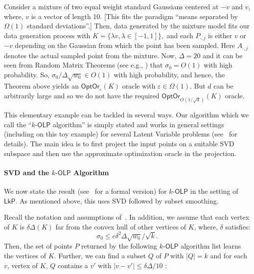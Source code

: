\documentclass[11pt,letterpaper]{article}
\newcommand{\lkp}{{\mathsf {LkP}}\xspace}
\newcommand{\olp}{{\mathsf {OLP}}\xspace}
\newcommand{\kolp}{k\mbox{-}\olp}
\newcommand{\Pdot}[1]{{P_{\cdot, #1}}}
\newcommand{\Adot}[1]{{A_{\cdot, #1}}}
\newcommand{\opto}{{\mathsf{OptOr}}}
\begin{document}
Consider a mixture of two equal weight standard Gaussians centered at $-v$ and $v$, where, $v$ is a vector of length 10. [This fits the paradigm ``means separated by $\Omega(1)$ standard deviations''.] Then, data generated by the mixture model fits our data generation process with $K=\{ \lambda v, \lambda\in [-1,1]\},$ and each $\Pdot{j}$ is either $v$ or $-v$ depending on the Gaussian from which the point has been sampled. Here $\Adot{j}$ denotes the actual sampled point from the mixture. 
Now, $\Delta =20$ and it can be seen from Random Matrix Theorems (see e.g., \cite{vers}) that $\sigma_0=O(1)$ with high probability. 
So, $\sigma_0/\Delta\sqrt{w_0}\in O(1)$ with high probability, and hence, the Theorem above 
yields an $\opto_\varepsilon(K)$ oracle with $\varepsilon\in\Omega(1)$. But
$d$ can be arbitrarily large and so we do not have the required $\opto_{O(1/\sqrt d)}(K)$  oracle. 

This elementary example can be tackled in several ways. Our algorithm which we call the ``$\kolp$ algorithm'' is simply stated and works in general settings (including on this toy example) for several Latent Variable problems (see~ for details). The main idea is to first project the input points on a suitable SVD subspace and then use the approximate optimization oracle in the projection.

\paragraph{SVD and the $\kolp$ Algorithm}

We now state the result (see~ for a formal version) for $\kolp$ in the setting of $\lkp$. As mentioned above, this uses SVD followed by subset smoothing. 

\begin{theorem}\label{kolp-thm}
Recall the notation and assumptions of~. In addition, we assume that each vertex of $K$ is $\delta\Delta(K)$ far from the convex hull of other vertices of $K$, where, $\delta$ satisfies:
$$\sigma_0\leq c\delta^2\Delta\sqrt {w_0}/\sqrt k.$$
Then, the set of points $P$ returned by the following $\kolp$ algorithm list learns the vertices of $K$. 
Further, we can find a subset $Q$ of $P$ with $|Q|=k$ and for each $v$, vertex of $K$, $Q$ contains a $v'$ with $|v-v'|\leq \delta\Delta /10$ :
\end{theorem}
\end{document}
